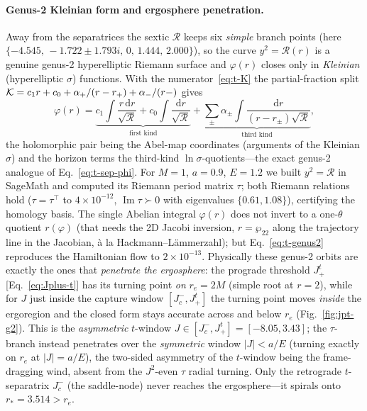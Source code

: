 \documentclass[
    aps, prd, twocolumn, superscriptaddress,
    showpacs, nofootinbib, floatfix
]{revtex4-2}
\newcommand{\rp}{r_{+}}
\newcommand{\dd}{\mathrm{d}}
\begin{document}
\paragraph{Genus-2 Kleinian form and ergosphere penetration.} Away from the
separatrices the sextic $\mathcal R$ keeps six \emph{simple} branch points
(here $\{-4.545,\,-1.722\pm1.793i,\,0,\,1.444,\,2.000\}$), so the curve
$y^2=\mathcal R(r)$ is a genuine genus-2 hyperelliptic Riemann surface and
$\varphi(r)$ closes only in \emph{Kleinian} (hyperelliptic $\sigma$) functions.
With the numerator~\eqref{eq:t-K} the partial-fraction split
$\mathcal K=c_1 r+c_0+\alpha_+/(r-\rp)+\alpha_-/(r-\rm)$ gives
\begin{equation}
    \varphi(r)=\underbrace{c_1\!\!\int\!\frac{r\,\dd r}{\sqrt{\mathcal R}}
      +c_0\!\!\int\!\frac{\dd r}{\sqrt{\mathcal R}}}_{\text{first kind}}
      +\underbrace{\sum_{\pm}\alpha_\pm\!\!\int\!
      \frac{\dd r}{(r-r_\pm)\sqrt{\mathcal R}}}_{\text{third kind}},
    \label{eq:t-genus2}
\end{equation}
the holomorphic pair being the Abel-map coordinates (arguments of the Kleinian
$\sigma$) and the horizon terms the third-kind $\ln\sigma$-quotients---the exact
genus-2 analogue of Eq.~\eqref{eq:t-sep-phi}. For $M=1$, $a=0.9$, $E=1.2$ we
built $y^2=\mathcal R$ in SageMath and computed its Riemann period matrix
$\tau$; both Riemann relations hold ($\tau=\tau^\top$ to $4\times10^{-12}$,
$\operatorname{Im}\tau\succ0$ with eigenvalues $\{0.61,1.08\}$), certifying the
homology basis. The single Abelian integral $\varphi(r)$ does not invert to a
one-$\theta$ quotient $r(\varphi)$ (that needs the 2D Jacobi inversion,
$r=\wp_{22}$ along the trajectory line in the Jacobian, à la
Hackmann--L\"ammerzahl); but Eq.~\eqref{eq:t-genus2} reproduces the Hamiltonian
flow to $2\times10^{-13}$. Physically these genus-2 orbits are exactly the ones
that \emph{penetrate the ergosphere}: the prograde threshold $J_+^t$
[Eq.~\eqref{eq:Jplus-t}] has its turning point \emph{on} $r_e=2M$ (simple root at
$r=2$), while for $J$ just inside the capture window $[J_c^-,J_+^t]$ the turning
point moves \emph{inside} the ergoregion and the closed form stays accurate
across and below $r_e$ (Fig.~\ref{fig:jpt-g2}). This is the \emph{asymmetric}
$t$-window $J\in[J_c^-,J_+^t]=[-8.05,3.43]$; the $\tau$-branch instead penetrates
over the \emph{symmetric} window $|J|<a/E$ (turning exactly on $r_e$ at
$|J|=a/E$), the two-sided asymmetry of the $t$-window being the frame-dragging
wind, absent from the $J^2$-even $\tau$ radial turning. Only the retrograde
$t$-separatrix $J_c^-$ (the saddle-node) never reaches the ergosphere---it
spirals onto $r_*=3.514>r_e$.
\end{document}
